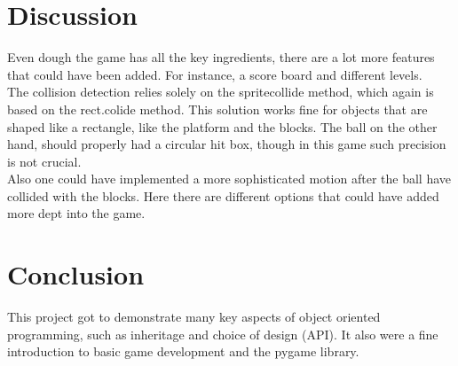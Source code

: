 \documentclass[12pt]{article}
\begin{document}
        \section{Discussion}
            Even dough the game has all the key ingredients, there are a lot more features that could have been added. For instance, a score board and different levels.\\
            
            The collision detection relies solely on the spritecollide method, which again is based on the rect.colide method. This solution works fine for objects that are shaped like a rectangle, like the platform and the blocks. The ball on the other hand, should properly had a circular hit box, though in this game such precision is not crucial. \\
            Also one could have implemented a more sophisticated motion after the ball have collided with the blocks. Here there are different options that could have added more dept into the game. 
                
        \section{Conclusion}
            This project got to demonstrate many key aspects of object oriented programming, such as inheritage and choice of design (API). It also were a fine introduction to basic game development and the pygame library. 




\end{document}
